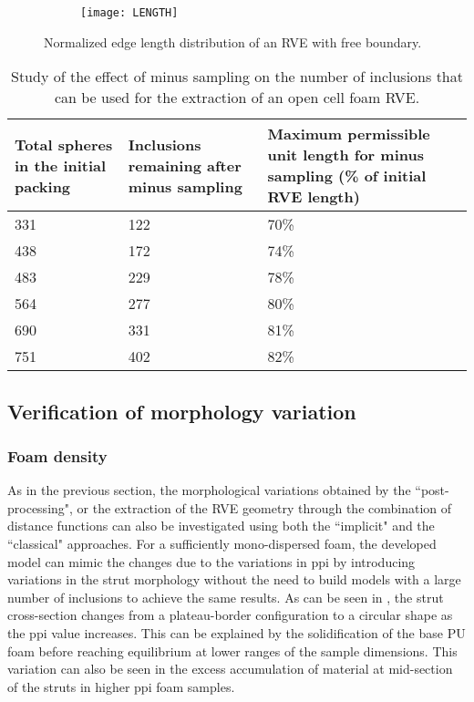 \begin{figure}
	\centering
	\begin{subfigure}[b]{0.45\textwidth}
		\texttt{[image: LENGTH]}
	\end{subfigure}

	\caption{Normalized edge length distribution of an RVE with free boundary.}\label{RSA_edgelength}
\end{figure}

\begin{table}
\small{
	\begin{center}
		\caption{Study of the effect of minus sampling on the number of inclusions that can be used for the extraction of an open cell foam RVE.}\label{tab_minus_sampling}
		\begin{tabularx}{\columnwidth}{X|X|X}
			\hline
			Total spheres in the initial packing  & Inclusions remaining after minus sampling & Maximum permissible unit length for minus sampling (\% of initial RVE length)\\[0.5ex]
			\hline
			331 & 122 & 70\%\\[1ex]
			438 & 172 & 74\%\\[1ex]
			483 & 229 & 78\%\\[1ex]
			564 & 277 & 80\%\\[1ex]
			690 & 331 & 81\%\\[1ex]
			751 & 402 & 82\%\\[1ex]
			\hline
		\end{tabularx}
	\end{center}}
\end{table}

\subsection{Verification of morphology variation}
\subsubsection{Foam density}
As in the previous section, the morphological variations obtained by the ``post-processing", or the extraction of the RVE geometry through the combination of distance functions can also be investigated using both the ``implicit" and the ``classical" approaches. For a sufficiently mono-dispersed foam, the developed model can mimic the changes due to the variations in ppi by introducing variations in the strut morphology without the need to build models with a large number of inclusions to achieve the same results. As can be seen in \cite{jungMicrostructuralCharacterisationExperimental2017,perrotPeriodicUnitCell2007}, the strut cross-section changes from a plateau-border configuration to a circular shape as the ppi value increases. This can be explained by the solidification of the base PU foam before reaching equilibrium at lower ranges of the sample dimensions. This variation can also be seen in the excess accumulation of material at mid-section of the struts in higher ppi foam samples.


